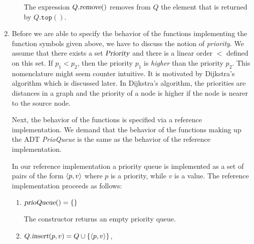 \begin{Definition}
\begin{enumerate}
\begin{enumerate}
              The expression $Q.\textsl{remove}()$ removes from $Q$ the element that is returned by
              $Q.\texttt{top}()$.
        \end{enumerate}
\item Before we are able to specify the behavior of the functions implementing the function symbols
      given above, we have to discuss the notion of \emph{priority}.  We assume that there exists
      a set $\textsl{Priority}$ and there is a linear order $<$ defined on this set.
      If  $p_1 < p_2$, then the priority $p_1$ is \emph{higher} than the priority $p_2$.  This
      nomenclature might seem counter intuitive.  It is motivated by 
      Dijkstra's algorithm which is discussed later.  In Dijkstra's algorithm, the priorities are
      distances in a graph and the priority of a node is higher if the node is nearer to the source
      node.

      Next, the behavior of the functions is specified via a reference implementation.  We demand
      that the behavior of the functions making up the ADT \textsl{PrioQueue} is the same
      as the behavior of the reference implementation.
      
      In our reference implementation a priority queue is implemented as a set of pairs of the form 
      $\pair(p,v)$ where $p$ is a priority, while $v$ is a value.  The reference implementation
      proceeds as follows:
      \begin{enumerate}
      \item $\textsl{prioQueue}() = \{\}$

            The constructor returns an empty priority queue.
      \item $Q.\textsl{insert}(p, v) = Q \cup \{ \pair(p,v) \}$,
        

\end{enumerate}
\end{enumerate}
\end{Definition}
